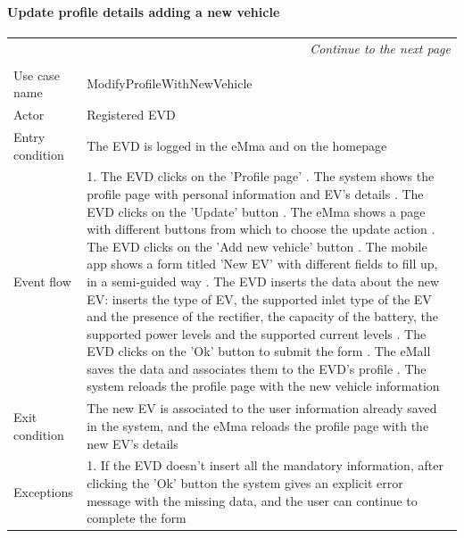 \paragraph{Update profile details adding a new vehicle}
\begin{center}
    \begin{longtable}{p{4cm} p{11cm}}
    \multicolumn{2}{r}{\itshape{Continue to the next page}}\\
    \endfoot 
    \\
    \endlastfoot
    \hline
     Use case name &  ModifyProfileWithNewVehicle\\
     \hline
     Actor & Registered EVD \\
     \hline
     Entry condition & The EVD is logged in the eMma and on the homepage \\
     \hline
     Event flow &   1. The EVD clicks on the 'Profile page' \newline
                    2. The system shows the profile page with personal information and EV's details \newline
                    3. The EVD clicks on the 'Update' button \newline
                    4. The eMma shows a page with different buttons from which to choose the update action \newline
                    5. The EVD clicks on the 'Add new vehicle' button \newline
                    6. The mobile app shows a form titled 'New EV' with different fields to fill up, in a semi-guided way \newline
                    7. The EVD inserts the data about the new EV: inserts the type of EV, the supported inlet type of the EV and the presence of the rectifier, the capacity of the battery, the supported power levels and the supported current levels \newline
                    8. The EVD clicks on the 'Ok' button to submit the form \newline
                    9. The eMall saves the data and associates them to the EVD's profile \newline
                    10. The system reloads the profile page with the new vehicle information \\
     \hline
     Exit condition &  The new EV is associated to the user information already saved in the system, and the eMma reloads the profile page with the new EV's details\\
     \hline
     Exceptions &   1. If the EVD doesn't insert all the mandatory information, after clicking the 'Ok' button the                     system gives an explicit error message with the missing data, and the user can continue to                       complete the form \newline

\end{longtable}
\end{center}
